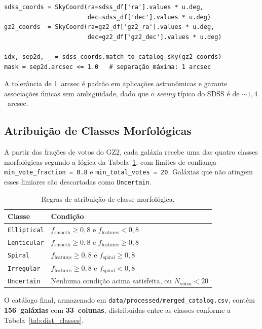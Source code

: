 \documentclass[12pt, a4paper]{article}
\begin{document}
\begin{lstlisting}[caption={Cruzamento espacial entre SDSS e GZ2.}, label=lst:crossmatch]
sdss_coords = SkyCoord(ra=sdss_df['ra'].values * u.deg,
                       dec=sdss_df['dec'].values * u.deg)
gz2_coords  = SkyCoord(ra=gz2_df['gz2_ra'].values * u.deg,
                       dec=gz2_df['gz2_dec'].values * u.deg)

idx, sep2d, _ = sdss_coords.match_to_catalog_sky(gz2_coords)
mask = sep2d.arcsec <= 1.0   # separação máxima: 1 arcsec
\end{lstlisting}

A tolerância de 1~arcsec é padrão em aplicações astronômicas e garante
associações únicas sem ambiguidade, dado que o \textit{seeing} típico do SDSS
é de $\sim1{,}4$~arcsec.

\subsection{Atribuição de Classes Morfológicas}

A partir das frações de votos do GZ2, cada galáxia recebe uma das quatro
classes morfológicas segundo a lógica da Tabela~\ref{tab:classes}, com limites
de confiança \texttt{min\_vote\_fraction = 0.8} e \texttt{min\_total\_votes = 20}.
Galáxias que não atingem esses limiares são descartadas como \texttt{Uncertain}.

\begin{table}[H]
  \centering
  \caption{Regras de atribuição de classe morfológica.}
  \label{tab:classes}
  \begin{tabular}{lp{9cm}}
    \toprule
    \textbf{Classe} & \textbf{Condição} \\
    \midrule
    \texttt{Elliptical}  & $f_\text{smooth} \geq 0{,}8$ e $f_\text{features} < 0{,}8$ \\
    \texttt{Lenticular}  & $f_\text{smooth} \geq 0{,}8$ e $f_\text{features} \geq 0{,}8$ \\
    \texttt{Spiral}      & $f_\text{features} \geq 0{,}8$ e $f_\text{spiral} \geq 0{,}8$ \\
    \texttt{Irregular}   & $f_\text{features} \geq 0{,}8$ e $f_\text{spiral} < 0{,}8$ \\
    \texttt{Uncertain}   & Nenhuma condição acima satisfeita, ou $N_\text{votos} < 20$ \\
    \bottomrule
  \end{tabular}
\end{table}

O catálogo final, armazenado em \texttt{data/processed/merged\_catalog.csv},
contém \textbf{156~galáxias} com \textbf{33~colunas}, distribuídas entre as
classes conforme a Tabela~\ref{tab:dist_classes}.
\end{document}
